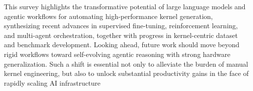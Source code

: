 

This survey highlights the transformative potential of large language models and agentic workflows for automating high-performance kernel generation, synthesizing recent advances in supervised fine-tuning, reinforcement learning, and multi-agent orchestration, together with progress in kernel-centric dataset and benchmark development. Looking ahead, future work should move beyond rigid workflows toward self-evolving agentic reasoning with strong hardware generalization. Such a shift is essential not only to alleviate the burden of manual kernel engineering, but also to unlock substantial productivity gains in the face of rapidly scaling AI infrastructure


